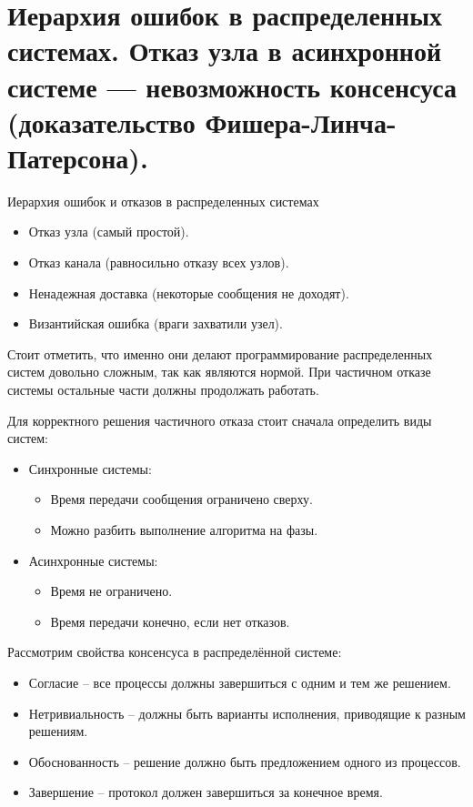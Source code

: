 \section{Иерархия ошибок в распределенных системах. Отказ узла в асинхронной системе --- невозможность консенсуса (доказательство Фишера-Линча-Патерсона).}
 
\begin{definition} Иерархия ошибок и отказов в распределенных системах
    \begin{itemize}
        \item Отказ узла (самый простой).
        \item Отказ канала (равносильно отказу всех узлов).
        \item Ненадежная доставка (некоторые сообщения не доходят).
        \item Византийская ошибка (враги захватили узел).
    \end{itemize}
\end{definition}
 
\begin{remark}
Стоит отметить, что именно они делают программирование распределенных систем довольно 
сложным, так как являются нормой. При частичном отказе системы остальные части должны 
продолжать работать.
 
Для корректного решения частичного отказа стоит сначала определить виды систем:
\begin{itemize}
    \item Синхронные системы:
        \begin{itemize}
            \item Время передачи сообщения ограничено сверху.
            \item Можно разбить выполнение алгоритма на фазы.
        \end{itemize}
    \item Асинхронные системы:
        \begin{itemize}
            \item Время не ограничено.
            \item Время передачи конечно, если нет отказов.
        \end{itemize}
\end{itemize}
\end{remark}
 
\begin{definition} Рассмотрим свойства консенсуса в распределённой системе:
    \begin{itemize}
        \item Согласие -- все процессы должны завершиться с одним и тем же решением.
        \item Нетривиальность -- должны быть варианты исполнения, приводящие к разным решениям.
        \item Обоснованность -- решение должно быть предложением одного из процессов.
        \item Завершение -- протокол должен завершиться за конечное время.
    \end{itemize} 
\end{definition}

